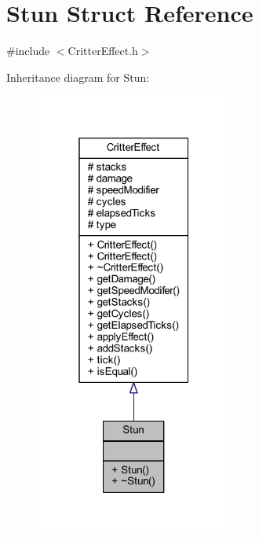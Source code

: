 \hypertarget{struct_stun}{\section{Stun Struct Reference}
\label{struct_stun}
}


{\ttfamily \#include $<$Critter\+Effect.\+h$>$}



Inheritance diagram for Stun\+:\nopagebreak
\begin{figure}[H]
\begin{center}
\leavevmode
\includegraphics[width=184pt]{struct_stun__inherit__graph}
\end{center}
\end{figure}



